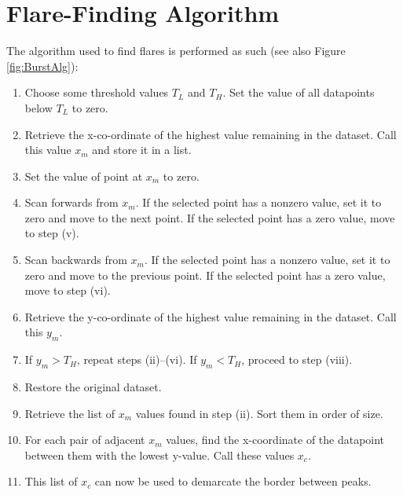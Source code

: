 \chapter{Flare-Finding Algorithm}
\label{app:Flares}

\par The algorithm used to find flares is performed as such (see also Figure \ref{fig:BurstAlg}):

\begin{enumerate}
  \item Choose some threshold values $T_L$ and $T_H$.  Set the value of all datapoints below $T_L$ to zero.
  \item Retrieve the x-co-ordinate of the highest value remaining in the dataset.  Call this value $x_m$ and store it in a list.
  \item Set the value of point at $x_m$ to zero.
  \item Scan forwards from $x_m$.  If the selected point has a nonzero value, set it to zero and move to the next point.  If the selected point has a zero value, move to step (v).
  \item Scan backwards from $x_m$.  If the selected point has a nonzero value, set it to zero and move to the previous point.  If the selected point has a zero value, move to step (vi).
  \item Retrieve the y-co-ordinate of the highest value remaining in the dataset.  Call this $y_m$.
  \item If $y_m>T_H$, repeat steps (ii)--(vi).  If $y_m<T_H$, proceed to step (viii).
  \item Restore the original dataset.
  \item Retrieve the list of $x_m$ values found in step (ii).  Sort them in order of size.
  \item For each pair of adjacent $x_m$ values, find the x-coordinate of the datapoint between them with the lowest y-value.  Call these values $x_c$.
  \item This list of $x_c$ can now be used to demarcate the border between peaks.
\end{enumerate}

